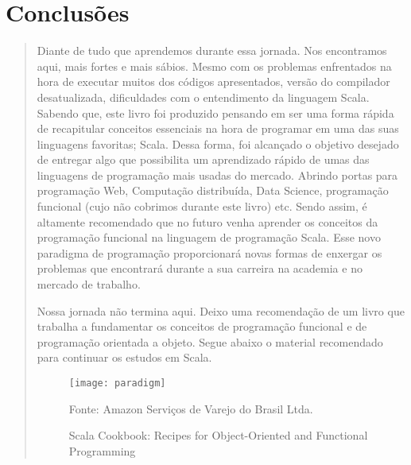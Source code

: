 

\chapter{Conclus\~{o}es}
\begin{quote}
    Diante de tudo que aprendemos durante essa jornada. Nos encontramos aqui, mais fortes e mais sábios.
    Mesmo com os problemas enfrentados na hora de executar muitos dos códigos apresentados, versão do compilador desatualizada, dificuldades com o entendimento da linguagem Scala.
    Sabendo que, este livro foi produzido pensando em ser uma forma rápida de recapitular conceitos essenciais na hora de programar em uma das suas linguagens favoritas; Scala. Dessa forma, foi alcançado o objetivo desejado de entregar algo que possibilita um aprendizado rápido de umas das linguagens de programação mais usadas do mercado. Abrindo portas para programação Web, Computação distribuída, Data Science, programação funcional (cujo não cobrimos durante este livro) etc.
    Sendo assim, é altamente recomendado que no futuro venha aprender os conceitos da programação funcional na linguagem de programação Scala. Esse novo paradigma de programação proporcionará novas formas de enxergar os problemas que encontrará durante a sua carreira na academia e no mercado de trabalho.

    Nossa jornada não termina aqui. Deixo uma recomendação de um livro que trabalha a fundamentar os conceitos de programação funcional e de programação orientada a objeto. Segue abaixo o material recomendado para continuar os estudos em Scala.
    \begin{figure}[H]
        \begin{center}
            \texttt{[image: paradigm]}
            \caption{Scala Cookbook: Recipes for Object-Oriented and Functional Programming} \label{ling2}
            {\tiny \sf Fonte: Amazon Serviços de Varejo do Brasil Ltda.  }
        \end{center}
    \end{figure}
\end{quote}
